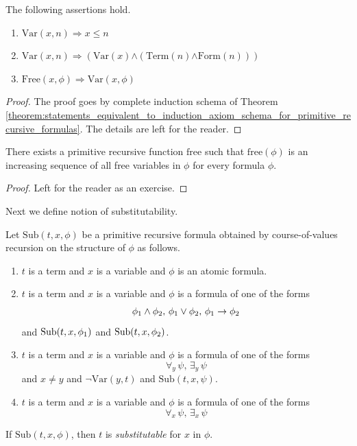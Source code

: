 \documentclass[10pt]{amsart}
\newcommand{\mra}{\boldsymbol{\Rightarrow}}
\newcommand{\mand}{\boldsymbol{\wedge}}
\newcommand{\mneg}{\boldsymbol{\neg}}
\newcommand{\mneq}{\boldsymbol{\neq}}
\begin{document}
\begin{fact}\label{fact:basic_properties_of_variables_and_free_variables}
	The following assertions hold.
	\begin{enumerate}[label=\emph{\textbf{(\arabic*)}}, leftmargin=3.0em]
		\item $\mathrm{Var}(x,n) \mra x \leq n$
		\item $\mathrm{Var}(x,n) \mra \left(\mathrm{Var}(x) \mand \left(\mathrm{Term}(n) \mand \mathrm{Form}(n)\right)\right)$
		\item $\mathrm{Free}(x,\phi) \mra \mathrm{Var}(x,\phi)$
	\end{enumerate}
\end{fact}
\begin{proof}
	The proof goes by complete induction schema of Theorem \ref{theorem:statements_equivalent_to_induction_axiom_schema_for_primitive_recursive_formulas}. The details are left for the reader.
\end{proof}

\begin{fact}\label{fact:free_variable_sequence_of_a_formula}
	There exists a primitive recursive function $\mathrm{free}$ such that $\mathrm{free}(\phi)$ is an increasing sequence of all free variables in $\phi$ for every formula $\phi$.
\end{fact}
\begin{proof}
	Left for the reader as an exercise.
\end{proof}
\noindent
Next we define notion of substitutability.

\begin{definition}
	Let $\mathrm{Sub}(t,x,\phi)$ be a primitive recursive formula obtained by course-of-values recursion on the structure of $\phi$ as follows.
	\begin{enumerate}[label=\textbf{(\arabic*)}, leftmargin=3.0em]
		\item $t$ is a term and $x$ is a variable and $\phi$ is an atomic formula.
		\item $t$ is a term and $x$ is a variable and $\phi$ is a formula of one of the forms
		      $$\phi_{\rm{1}}\wedge \phi_{\rm{2}},\,\phi_{\rm{1}} \vee \phi_{\rm{2}},\,\phi_{\rm{1}}\rightarrow \phi_{\rm{2}}$$
		      and $\mathrm{Sub}(t,x,\phi_{\rm{1}})$ and $\mathrm{Sub}(t,x,\phi_{\rm{2}})$.
		\item $t$ is a term and $x$ is a variable and $\phi$ is a formula of one of the forms
		      $$\forall_y\,\psi,\,\exists_y\,\psi$$
          and $x \mneq y$ and $\mneg \mathrm{Var}(y,t)$ and $\mathrm{Sub}(t,x,\psi)$.
		\item $t$ is a term and $x$ is a variable and $\phi$ is a formula of one of the forms
		      $$\forall_x\,\psi,\,\exists_x\,\psi$$
	\end{enumerate}
	If $\mathrm{Sub}(t,x,\phi)$, then $t$ is \textit{substitutable} for $x$ in $\phi$.
\end{definition}
\end{document}
